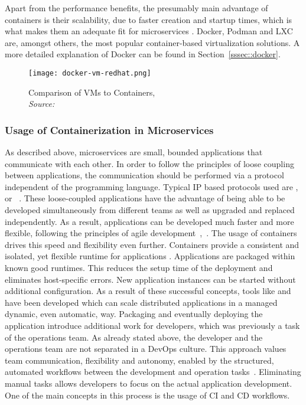         Apart from the performance benefits, the presumably main advantage of containers is their scalability, due to faster creation and startup times, which is what makes them an adequate fit for microservices \cite{cintainer_scale}. Docker, Podman and LXC are, amongst others, the most popular container-based virtualization solutions. A more detailed explanation of Docker can be found in Section~\ref{sssec::docker}.

        \begin{figure}
            \centering
            \texttt{[image: docker-vm-redhat.png]}
            \caption{Comparison of \ac{VM}s to Containers, \\\textit{Source:~\cite{redhat_pic}}}\label{fig::vm_docker}
        \end{figure}

        \subsubsection{Usage of Containerization in Microservices}
        As described above, microservices are small, bounded applications that communicate with each other. In order to follow the principles of loose coupling between applications, the communication should be performed via a protocol independent of the programming language. Typical IP based protocols used are ,  or ~\cite{micro}. These loose-coupled applications have the advantage of being able to be developed simultaneously from different teams as well as upgraded and replaced independently. As a result, applications can be developed much faster and more flexible, following the principles of agile development~\cite{micro},~\cite{redhat_micro}.\newline
        The usage of containers drives this speed and flexibility even further. Containers provide a consistent and  isolated, yet flexible runtime for applications \cite{micro_container}. Applications are packaged within known good runtimes. This reduces the setup time of the deployment and eliminates host-specific errors. New application instances can be started without additional configuration. As a result of these successful concepts, tools like  and  have been developed which can scale distributed applications in a managed dynamic, even automatic, way.\newline
        Packaging and eventually deploying the application introduce additional work for developers, which was previously a task of the operations team. As already stated above, the developer and the operations team are not separated in a DevOps culture. This approach values team communication, flexibility and autonomy, enabled by the structured, automated workflows between the development and operation tasks~\cite{effective_devops}. Eliminating manual tasks allows developers to focus on the actual application development. One of the main concepts in this process is the usage of \ac{CI} and \ac{CD} workflows.

